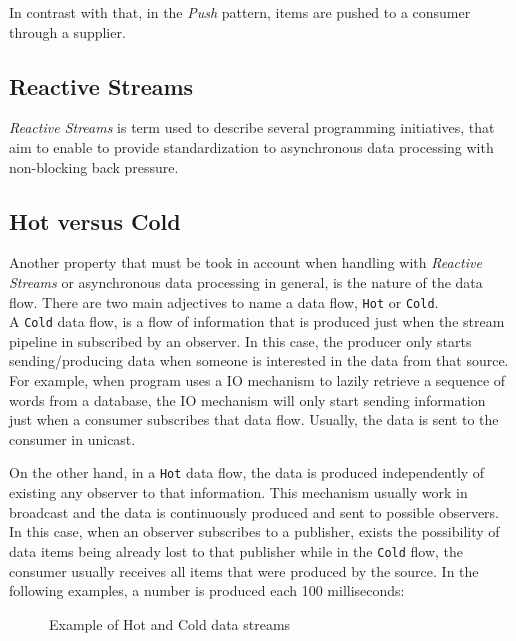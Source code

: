 	In contrast with that, in the \textit{Push} pattern, items are pushed to a consumer through a supplier.


	\subsection{Reactive Streams} 
	\textit{Reactive Streams} is term used to describe several programming initiatives, that aim to enable to provide standardization to asynchronous data processing with non-blocking back pressure. 


	\subsection{Hot versus Cold}
	
	Another property that must be took in account when handling with \textit{Reactive Streams} or asynchronous data processing in general, is the nature of the data flow. There are two main adjectives to name a data flow, \texttt{Hot} or \texttt{Cold}.  \\

	A \texttt{Cold} data flow, is a flow of information that is produced just when the stream pipeline in subscribed by an observer. In this case, the producer only starts sending/producing data when someone is interested in the data from that source. 
	For example, when program uses a IO mechanism to lazily retrieve a sequence of words from a database, the IO mechanism will only start sending information just when a consumer subscribes that data flow. Usually, the data is sent to the consumer in unicast.

	On the other hand, in a \texttt{Hot} data flow, the data is produced independently of existing any observer to that information. This mechanism usually work in broadcast and the data is continuously produced and sent to possible observers.
	In this case, when an observer subscribes to a publisher, exists the possibility of data items being already lost to that publisher while in the \texttt{Cold} flow, the consumer usually receives all items that were produced by the source.
	In the following examples, a number is produced each 100 milliseconds:

	\begin{figure}[H]
		\centering
		\begin{subfigure}[h]{1.2\textwidth}
			\centering
			\caption{}
		 \end{subfigure}	
	\qquad\qquad
		 \begin{subfigure}[h]{1.2\textwidth}
			\centering
			\caption{}
		\end{subfigure}		
	  \caption{Example of Hot and Cold data streams}
	  \label{fig:exmplo3}
	\end{figure}

